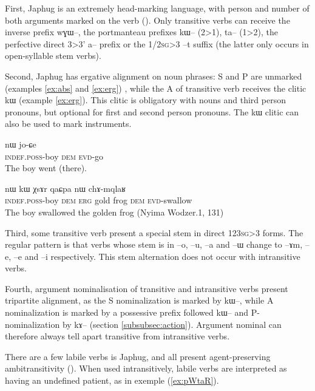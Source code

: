 \documentclass[oldfontcommands,oneside,a4paper,11pt]{article}
\newcommand{\ipa}[1]{{\phon \mbox{#1}}} %
\begin{document}
First,  Japhug  is an extremely head-marking language, with person and number of both arguments marked on the verb (\citealt{jacques10inverse}). Only transitive verbs can receive the inverse prefix \ipa{wɣɯ}--, the portmanteau prefixes \ipa{kɯ}-- (2>1), \ipa{ta}-- (1>2), the perfective direct 3>3'  \ipa{a}-- prefix or  the 1/\textsc{2sg}>3 --\ipa{t} suffix (the latter only occurs in open-syllable stem verbs).


Second, Japhug has ergative alignment on noun phrases:  S and P are unmarked (examples \ref{ex:abs} and \ref{ex:erg}) , while the A of transitive verb receives the clitic \ipa{kɯ} (example \ref{ex:erg}). This clitic is obligatory with nouns and third person pronouns, but optional for first and second person pronouns. The \ipa{kɯ} clitic can also be used to mark instruments.

\begin{exe}
\ex \label{ex:abs}
\gll \ipa{tɤ-tɕɯ}  	\ipa{nɯ}  	 	\ipa{jo-ɕe}   \\
\textsc{indef.poss}-boy \textsc{dem}   \textsc{evd}-go \\
\glt The boy went (there).
\end{exe}

\begin{exe}
\ex \label{ex:erg}
\gll \ipa{tɤ-tɕɯ}  	\ipa{nɯ}  	\ipa{kɯ}  	\ipa{χsɤr}  	\ipa{qaɕpa}  	\ipa{nɯ}  	\ipa{chɤ-mqlaʁ}   \\
\textsc{indef.poss}-boy \textsc{dem} \textsc{erg} gold frog \textsc{dem} \textsc{evd}-swallow \\
\glt The boy swallowed the golden frog (Nyima Wodzer.1, 131)
\end{exe}

Third,  some transitive verb present a special stem in direct \textsc{123sg}>3 forms. The regular pattern is that verbs whose stem is in --\ipa{o}, --\ipa{u}, --\ipa{a} and --\ipa{ɯ} change to --\ipa{ɤm}, --\ipa{e}, --\ipa{e} and --\ipa{i} respectively. This stem alternation does not occur with intransitive verbs.

Fourth, argument nominalisation of transitive   and intransitive  verbs present tripartite alignment, as the S nominalization is marked by \ipa{kɯ}--, while A nominalization is marked by a possessive prefix followed \ipa{kɯ}-- and P-nominalization by \ipa{kɤ}-- (section \ref{subsubsec:action}). Argument nominal can therefore always tell apart transitive from intransitive verbs.


There are a few labile verbs is Japhug, and all present agent-preserving ambitransitivity  (\citet[217-9]{jacques12demotion}). When used intransitively, labile verbs are interpreted as having an undefined patient, as in exemple (\ref{ex:pWtaR}).
\end{document}
